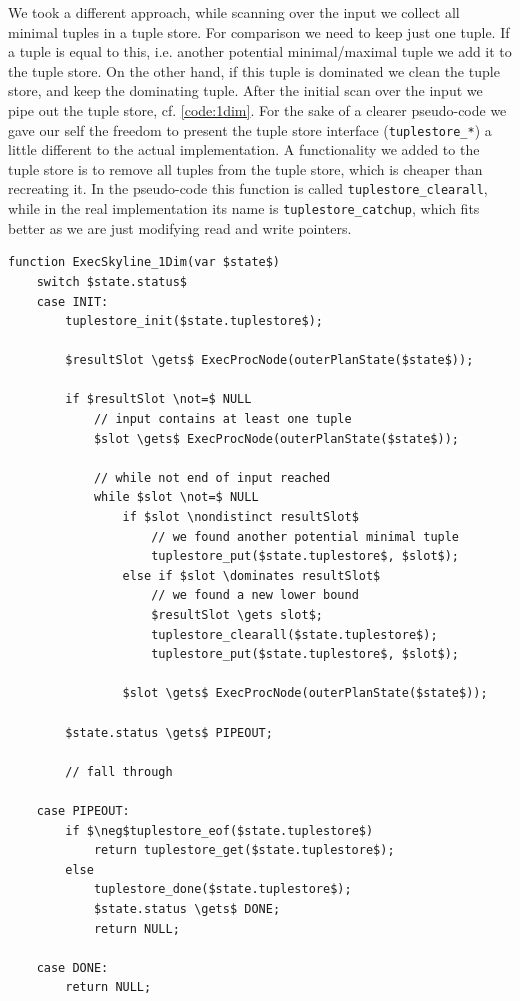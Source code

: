 We took a different approach, while scanning over the input we collect
all minimal tuples in a tuple store.  For
comparison we need to keep just one tuple.  If a tuple is equal to
this, i.e. another potential minimal/maximal tuple we add it to the
tuple store.  On the other hand, if this tuple is dominated we clean
the tuple store, and keep the dominating tuple.  After the initial
scan over the input we pipe out the tuple store,
cf. \autoref{code:1dim}.  For the sake of a clearer pseudo-code we
gave our self the freedom to present the tuple store interface
(\texttt{tuplestore\_*}) a little different to the actual
implementation.  A functionality we added to the tuple store is to
remove all tuples from the tuple store, which is cheaper than
recreating it.  In the pseudo-code this function is called
\texttt{tuplestore\_clearall}, while in the real implementation its name
is \texttt{tuplestore\_catchup}, which fits better as we are just
modifying read and write pointers.

\begin{lstlisting}[language=pseudo,
caption={Pseudo-code for Special case: 1 dimensional},
label={code:1dim}
]
function ExecSkyline_1Dim(var $state$)
	switch $state.status$
	case INIT:
		tuplestore_init($state.tuplestore$);

		$resultSlot \gets$ ExecProcNode(outerPlanState($state$));

		if $resultSlot \not=$ NULL
			// input contains at least one tuple
			$slot \gets$ ExecProcNode(outerPlanState($state$));

			// while not end of input reached
			while $slot \not=$ NULL
				if $slot \nondistinct resultSlot$
					// we found another potential minimal tuple
					tuplestore_put($state.tuplestore$, $slot$);
				else if $slot \dominates resultSlot$
					// we found a new lower bound
					$resultSlot \gets slot$;
					tuplestore_clearall($state.tuplestore$);
					tuplestore_put($state.tuplestore$, $slot$);

				$slot \gets$ ExecProcNode(outerPlanState($state$));

		$state.status \gets$ PIPEOUT;

		// fall through

	case PIPEOUT:
		if $\neg$tuplestore_eof($state.tuplestore$)
			return tuplestore_get($state.tuplestore$);
		else
			tuplestore_done($state.tuplestore$);
			$state.status \gets$ DONE;
			return NULL;

	case DONE:
		return NULL;
\end{lstlisting}

